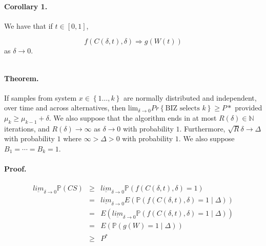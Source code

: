 \documentclass[11pt,english]{article}
\begin{document}
\paragraph*{Corollary 1.}

We have that if $t\in\left[0,1\right]$,

\[
f\left(C\left(\delta,t\right),\delta\right)\Rightarrow g\left(W\left(t\right)\right)
\]
as $\delta\rightarrow0$.

\[
\]



\paragraph*{Theorem.}

If samples from system $x\in\left\{ 1\ldots,k\right\} $ are normally
distributed and independent, over time and across alternatives, then
$\mbox{lim}_{\delta\rightarrow0}Pr\left\{ \mbox{BIZ selects }k\right\} \geq P*$
provided $\mu_{k}\geq\mu_{k-1}+\delta$. We also suppose that the
algorithm ends in at most $R\left(\delta\right)\in\mathbb{N}$ iterations,
and $R(\delta)\rightarrow\infty$ as $\delta\rightarrow0$ with probability
$1$. Furthermore, $\sqrt{R}\delta\rightarrow\Delta$ with probability
$1$ where $\infty>\Delta>0$ with probability $1$. We also suppose
$B_{1}=\cdots=B_{k}=1$.


\paragraph*{Proof.}

\begin{eqnarray*}
\underline{lim}_{\delta\rightarrow0}\mathbb{P}\left(CS\right) & \geq & \underline{lim}_{\delta\rightarrow0}\mathbb{P}\left(f\left(C\left(\delta,t\right),\delta\right)=1\right)\\
 & = & \underline{lim}_{\delta\rightarrow0}E\left(\mathbb{P}\left(f\left(C\left(\delta,t\right),\delta\right)=1\mid\Delta\right)\right)\\
 & = & E\left(\underline{lim}_{\delta\rightarrow0}\mathbb{P}\left(f\left(C\left(\delta,t\right),\delta\right)=1\mid\Delta\right)\right)\\
 & = & E\left(\mathbb{P}\left(g\left(W\right)=1\mid\Delta\right)\right)\\
 & \geq & P^{*}
\end{eqnarray*}
\end{document}
